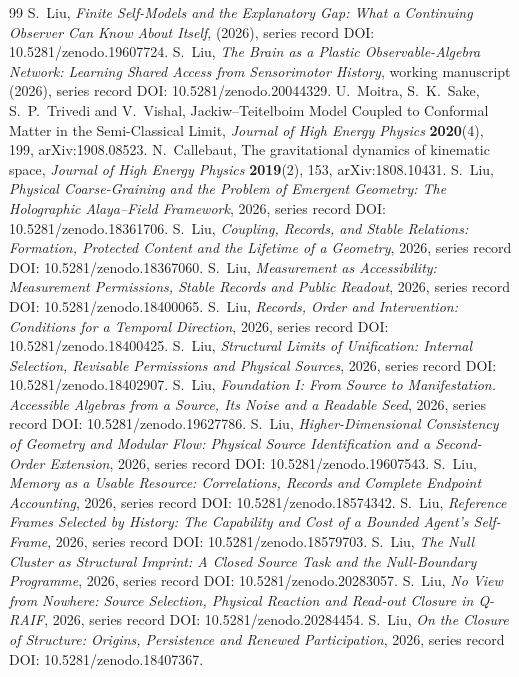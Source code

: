 \documentclass[11pt,a4paper]{article}
\begin{document}
\begin{thebibliography}{99}
 S.~Liu, \emph{Finite Self-Models and the Explanatory Gap: What a Continuing Observer Can Know About Itself}, (2026), series record DOI: 10.5281/zenodo.19607724.
 S.~Liu, \emph{The Brain as a Plastic Observable-Algebra Network: Learning Shared Access from Sensorimotor History}, working manuscript (2026), series record DOI: 10.5281/zenodo.20044329.
 U.~Moitra, S.~K.~Sake, S.~P.~Trivedi and V.~Vishal, Jackiw--Teitelboim Model Coupled to Conformal Matter in the Semi-Classical Limit, \emph{Journal of High Energy Physics} \textbf{2020}(4), 199, arXiv:1908.08523.
 N.~Callebaut, The gravitational dynamics of kinematic space, \emph{Journal of High Energy Physics} \textbf{2019}(2), 153, arXiv:1808.10431.
 S.~Liu, \emph{Physical Coarse-Graining and the Problem of Emergent Geometry: The Holographic Alaya--Field Framework}, 2026, series record DOI: 10.5281/zenodo.18361706.
 S.~Liu, \emph{Coupling, Records, and Stable Relations: Formation, Protected Content and the Lifetime of a Geometry}, 2026, series record DOI: 10.5281/zenodo.18367060.
 S.~Liu, \emph{Measurement as Accessibility: Measurement Permissions, Stable Records and Public Readout}, 2026, series record DOI: 10.5281/zenodo.18400065.
 S.~Liu, \emph{Records, Order and Intervention: Conditions for a Temporal Direction}, 2026, series record DOI: 10.5281/zenodo.18400425.
 S.~Liu, \emph{Structural Limits of Unification: Internal Selection, Revisable Permissions and Physical Sources}, 2026, series record DOI: 10.5281/zenodo.18402907.
 S.~Liu, \emph{Foundation I: From Source to Manifestation. Accessible Algebras from a Source, Its Noise and a Readable Seed}, 2026, series record DOI: 10.5281/zenodo.19627786.
 S.~Liu, \emph{Higher-Dimensional Consistency of Geometry and Modular Flow: Physical Source Identification and a Second-Order Extension}, 2026, series record DOI: 10.5281/zenodo.19607543.
 S.~Liu, \emph{Memory as a Usable Resource: Correlations, Records and Complete Endpoint Accounting}, 2026, series record DOI: 10.5281/zenodo.18574342.
 S.~Liu, \emph{Reference Frames Selected by History: The Capability and Cost of a Bounded Agent's Self-Frame}, 2026, series record DOI: 10.5281/zenodo.18579703.
 S.~Liu, \emph{The Null Cluster as Structural Imprint: A Closed Source Task and the Null-Boundary Programme}, 2026, series record DOI: 10.5281/zenodo.20283057.
 S.~Liu, \emph{No View from Nowhere: Source Selection, Physical Reaction and Read-out Closure in Q-RAIF}, 2026, series record DOI: 10.5281/zenodo.20284454.
 S.~Liu, \emph{On the Closure of Structure: Origins, Persistence and Renewed Participation}, 2026, series record DOI: 10.5281/zenodo.18407367.
\end{thebibliography}
\end{document}
